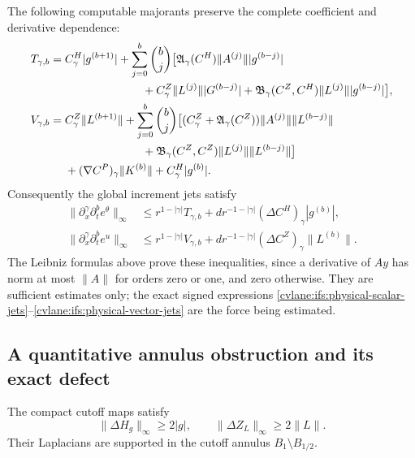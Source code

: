 The following computable majorants preserve the complete coefficient
and derivative dependence:
\begin{align}
 T_{\gamma,b}={}&C^H_\gamma|g^{(b+1)}|
  +\sum_{j=0}^b\binom bj\bigl[
    \mathfrak A_\gamma(C^H)\|A^{(j)}\||g^{(b-j)}|\nonumber\\
 &\hspace{24mm}+C^Z_\gamma\|L^{(j)}\||G^{(b-j)}|
    +\mathfrak B_\gamma(C^Z,C^H)\|L^{(j)}\||g^{(b-j)}|\bigr],
 \label{cvlane:ifs:scalar-majorant}\\
 V_{\gamma,b}={}&C^Z_\gamma\|L^{(b+1)}\|
  +\sum_{j=0}^b\binom bj\bigl[
    (C^Z_\gamma+\mathfrak A_\gamma(C^Z))
                         \|A^{(j)}\|\|L^{(b-j)}\|\nonumber\\
 &\hspace{24mm}+\mathfrak B_\gamma(C^Z,C^Z)
                         \|L^{(j)}\|\|L^{(b-j)}\|\bigr]\nonumber\\
 &+(\nabla C^P)_\gamma\|K^{(b)}\|+C^H_\gamma|g^{(b)}|.
 \label{cvlane:ifs:vector-majorant}
\end{align}
Consequently the global increment jets satisfy
\begin{align}
 \|\partial_x^\gamma\partial_t^b e^\theta\|_\infty
 &\leq r^{1-|\gamma|}T_{\gamma,b}
       +d r^{-1-|\gamma|}(\Delta C^H)_\gamma |g^{(b)}|,
 \nonumber\\
 \|\partial_x^\gamma\partial_t^b e^u\|_\infty
 &\leq r^{1-|\gamma|}V_{\gamma,b}
       +d r^{-1-|\gamma|}(\Delta C^Z)_\gamma \|L^{(b)}\|.
 \label{cvlane:ifs:force-majorants}
\end{align}
The Leibniz formulas above prove these inequalities, since a derivative
of $Ay$ has norm at most $\|A\|$ for orders zero or one, and zero
otherwise.  They are sufficient estimates only; the exact signed
expressions \eqref{cvlane:ifs:physical-scalar-jets}--\eqref{cvlane:ifs:physical-vector-jets}
are the force being estimated.

\subsection{A quantitative annulus obstruction and its exact defect}

\begin{cvlanlemma}\label{cvlane:ifs:cutoff-diffusion-lower-bound}
The compact cutoff maps satisfy
\[
 \|\Delta H_g\|_\infty\geq2|g|,\qquad
 \|\Delta Z_L\|_\infty\geq2\|L\|.
\]
Their Laplacians are supported in the cutoff annulus
$B_1\setminus B_{1/2}$.
\end{cvlanlemma}

